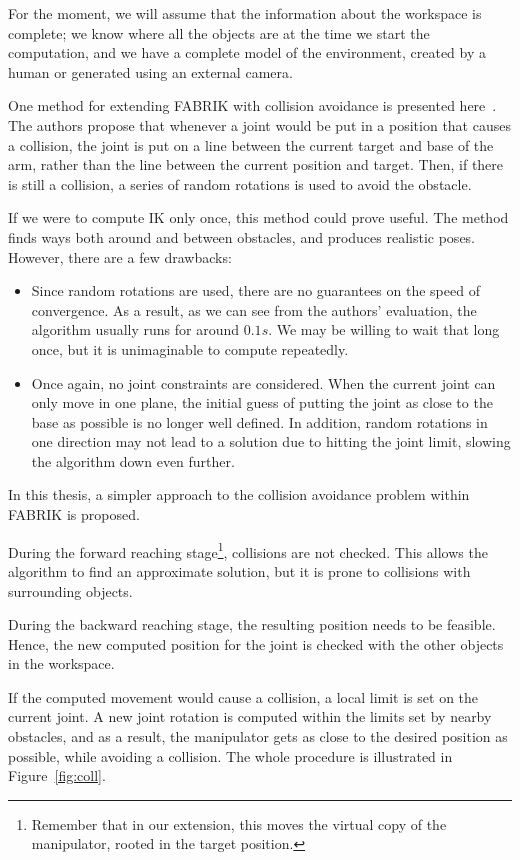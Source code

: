 For the moment, we will assume that the information about the workspace is complete; we know where all the objects are at the time we start the computation, and we have a complete model of the environment, created by a human or generated using an external camera.

One method for extending FABRIK with collision avoidance is presented here~\cite{fabrikAvoidance}. The authors propose that whenever a joint would be put in a position that causes a collision, the joint is put on a line between the current target and base of the arm, rather than the line between the current position and target. Then, if there is still a collision, a series of random rotations is used to avoid the obstacle.

If we were to compute IK only once, this method could prove useful. The method finds ways both around and between obstacles, and produces realistic poses. However, there are a few drawbacks:

\begin{itemize}
\item Since random rotations are used, there are no guarantees on the speed of convergence. As a result, as we can see from the authors' evaluation, the algorithm usually runs for around $0.1s$. We may be willing to wait that long once, but it is unimaginable to compute repeatedly.
\item Once again, no joint constraints are considered. When the current joint can only move in one plane, the initial guess of putting the joint as close to the base as possible is no longer well defined. In addition, random rotations in one direction may not lead to a solution due to hitting the joint limit, slowing the algorithm down even further.
\end{itemize}

In this thesis, a simpler approach to the collision avoidance problem within FABRIK is proposed.


During the forward reaching stage\footnote{Remember that in our extension, this moves the virtual copy of the manipulator, rooted in the target position.}, collisions are not checked. This allows the algorithm to find an approximate solution, but it is prone to collisions with surrounding objects.


During the backward reaching stage, the resulting position needs to be feasible. Hence, the new computed position for the joint is checked with the other objects in the workspace.

If the computed movement would cause a collision, a local limit is set on the current joint. A new joint rotation is computed within the limits set by nearby obstacles, and as a result, the manipulator gets as close to the desired position as possible, while avoiding a collision. The whole procedure is illustrated in Figure~\ref{fig:coll}.


